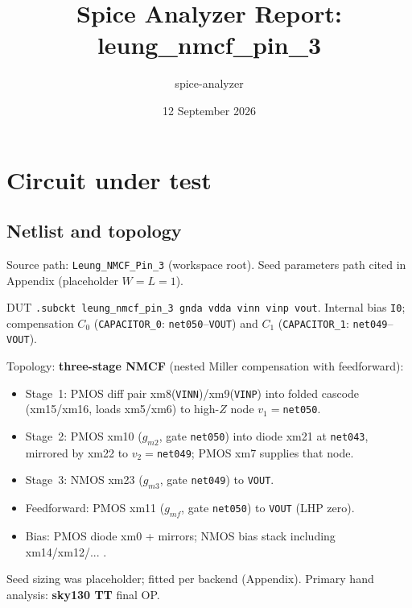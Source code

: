 \documentclass[11pt]{article}
\title{Spice Analyzer Report: leung\_nmcf\_pin\_3}
\author{spice-analyzer}
\date{12 September 2026}
\begin{document}
\maketitle
\tableofcontents
\clearpage

\section{Circuit under test}
\subsection{Netlist and topology}
Source path: \texttt{Leung\_NMCF\_Pin\_3}
(workspace root). Seed parameters path cited in Appendix (placeholder $W{=}L{=}1$).

DUT \texttt{.subckt leung\_nmcf\_pin\_3 gnda vdda vinn vinp vout}.
Internal bias \texttt{I0}; compensation $C_0$ (\texttt{CAPACITOR\_0}: \texttt{net050}--\texttt{VOUT})
and $C_1$ (\texttt{CAPACITOR\_1}: \texttt{net049}--\texttt{VOUT}).

Topology: \textbf{three-stage NMCF} (nested Miller compensation with feedforward):
\begin{itemize}
  \item Stage~1: PMOS diff pair xm8(\texttt{VINN})/xm9(\texttt{VINP}) into folded cascode
        (xm15/xm16, loads xm5/xm6) to high-$Z$ node $v_1{=}$\texttt{net050}.
  \item Stage~2: PMOS xm10 ($g_{m2}$, gate \texttt{net050}) into diode xm21 at \texttt{net043},
        mirrored by xm22 to $v_2{=}$\texttt{net049}; PMOS xm7 supplies that node.
  \item Stage~3: NMOS xm23 ($g_{m3}$, gate \texttt{net049}) to \texttt{VOUT}.
  \item Feedforward: PMOS xm11 ($g_{mf}$, gate \texttt{net050}) to \texttt{VOUT} (LHP zero).
  \item Bias: PMOS diode xm0 + mirrors; NMOS bias stack including xm14/xm12/... .
\end{itemize}
Seed sizing was placeholder; fitted per backend (Appendix). Primary hand analysis:
\textbf{sky130 TT} final OP.
\end{document}
